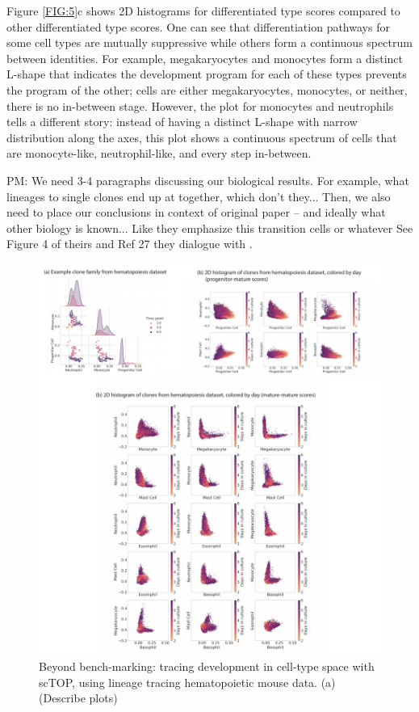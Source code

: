\documentclass[aps,superscriptaddress, notitlepage,longbibliography]{revtex4-1}
\begin{document}
Figure \ref{FIG:5}c shows 2D histograms for differentiated type scores compared to other differentiated type scores. One can see that differentiation pathways for some cell types are mutually suppressive while others form a continuous spectrum between identities. For example, megakaryocytes and monocytes form a distinct L-shape that indicates the development program for each of these types prevents the program of the other; cells are either megakaryocytes, monocytes, or neither, there is no in-between stage. However, the plot for monocytes and neutrophils tells a different story: instead of having a distinct L-shape with narrow distribution along the axes, this plot shows a continuous spectrum of cells that are monocyte-like, neutrophil-like, and every step in-between. 

{\color{red} PM: We need 3-4 paragraphs discussing our biological results. For example, what lineages to single clones end up at together, which don't they... Then, we also need to place our conclusions in context of original paper -- and ideally what other biology is known... Like they emphasize this transition cells or whatever See Figure 4 of theirs and Ref 27 they dialogue with . }

\begin{figure}
	\centering
		\includegraphics[scale=0.75]{figs/scTOP manuscript fig5.pdf}
	\caption{Beyond bench-marking: tracing development in cell-type space with scTOP, using lineage tracing hematopoietic mouse data. (a) {\color{red}} (Describe plots) }
	\label{FIG:4}
\end{figure}
\end{document}

